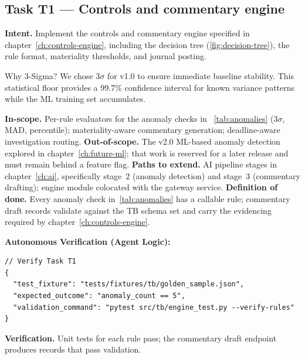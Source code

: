 \subsection*{Task T1 --- Controls and commentary engine}
\textbf{Intent.} Implement the controls and commentary engine
specified in chapter~\ref{ch:controls-engine}, including the decision
tree (\ref{fig:decision-tree}), the rule format, materiality
thresholds, and journal posting.

\begin{adrbox}{Why 3-Sigma?}
We chose $3\sigma$ for v1.0 to ensure immediate baseline stability. This statistical floor provides a 99.7\% confidence interval for known variance patterns while the ML training set accumulates.
\end{adrbox}

\textbf{In-scope.} Per-rule evaluators for the anomaly checks in
~\ref{tab:anomalies} (3$\sigma$, MAD, percentile); materiality-aware
commentary generation; deadline-aware investigation routing.
\textbf{Out-of-scope.} The v2.0 ML-based anomaly detection explored
in chapter~\ref{ch:future-ml}; that work is reserved for a later
release and must remain behind a feature flag.
\textbf{Paths to extend.} AI pipeline stages in
chapter~\ref{ch:ai}, specifically stage~2 (anomaly detection) and
stage~3 (commentary drafting); engine module colocated with the
gateway service.
\textbf{Definition of done.} Every anomaly check
in~\ref{tab:anomalies} has a callable rule; commentary draft records
validate against the TB schema set and carry the evidencing required
by chapter~\ref{ch:controls-engine}.

\textbf{Autonomous Verification (Agent Logic):}
\begin{lstlisting}[language=jsonx]
// Verify Task T1
{
  "test_fixture": "tests/fixtures/tb/golden_sample.json",
  "expected_outcome": "anomaly_count == 5",
  "validation_command": "pytest src/tb/engine_test.py --verify-rules"
}
\end{lstlisting}

\textbf{Verification.} Unit tests for each rule pass; the commentary
draft endpoint produces records that pass validation.

